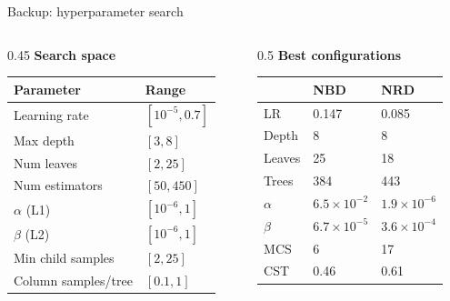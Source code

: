 \documentclass[11pt,aspectratio=169]{beamer}
\begin{document}
\begin{frame}{Backup: hyperparameter search}
  {\small
  \begin{columns}[T]
    \begin{column}{0.45\textwidth}
      \textbf{Search space}\\[0.2em]
      \begin{tabular}{@{}ll@{}}
        \toprule
        Parameter & Range\\
        \midrule
        Learning rate & $[10^{-5}, 0.7]$\\
        Max depth & $[3, 8]$\\
        Num leaves & $[2, 25]$\\
        Num estimators & $[50, 450]$\\
        $\alpha$ (L1) & $[10^{-6}, 1]$\\
        $\beta$ (L2) & $[10^{-6}, 1]$\\
        Min child samples & $[2, 25]$\\
        Column samples/tree & $[0.1, 1]$\\
        \bottomrule
      \end{tabular}
    \end{column}
    \begin{column}{0.5\textwidth}
      \textbf{Best configurations}\\[0.2em]
      \begin{tabular}{@{}lll@{}}
        \toprule
        & NBD & NRD\\
        \midrule
        LR & 0.147 & 0.085\\
        Depth & 8 & 8\\
        Leaves & 25 & 18\\
        Trees & 384 & 443\\
        $\alpha$ & $6.5\times10^{-2}$ & $1.9\times10^{-6}$\\
        $\beta$ & $6.7\times10^{-5}$ & $3.6\times10^{-4}$\\
        MCS & 6 & 17\\
        CST & 0.46 & 0.61\\
        \bottomrule
      \end{tabular}
    \end{column}
  \end{columns}}
\end{frame}
\end{document}
